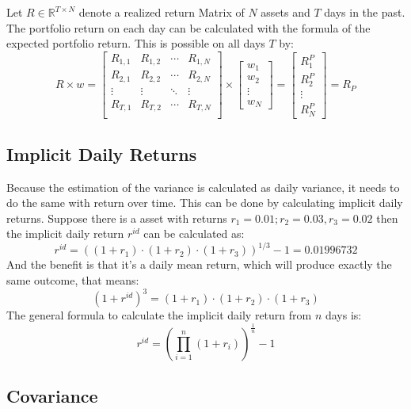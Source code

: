 \documentclass[
  oneside]{book}
\begin{document}
Let \(R \in \mathbb{R}^{T \times N}\) denote a realized return Matrix of \(N\) assets and \(T\) days in the past. The portfolio return on each day can be calculated with the formula of the expected portfolio return. This is possible on all days \(T\) by:
\[
  R \times w = 
  \begin{bmatrix}
    R_{1, 1} & R_{1, 2} & \cdots & R_{1, N} \\
    R_{2, 1} & R_{2, 2} & \cdots & R_{2, N} \\
    \vdots  & \vdots & \ddots & \vdots \\
    R_{T, 1} & R_{T, 2} & \cdots & R_{T, N} \\
 \end{bmatrix}
  \times 
  \begin{bmatrix}
    w_{1} \\ 
    w_{2} \\
    \vdots \\
    w_{N}  
 \end{bmatrix}
 =
   \begin{bmatrix}
    R_{1}^P \\ 
    R_{2}^P \\
    \vdots \\
    R_{N}^P  
 \end{bmatrix}
 =
 R_P
\]

\hypertarget{implicitdailyreturns}{%
\subsection{Implicit Daily Returns}\label{implicitdailyreturns}}

Because the estimation of the variance is calculated as daily variance, it needs to do the same with return over time. This can be done by calculating implicit daily returns. Suppose there is a asset with returns \(r_1 = 0.01; r_2=0.03, r_3=0.02\) then the implicit daily return \(r^{id}\) can be calculated as:
\[
  r^{id} = ((1+r_1) \cdot (1+r_2) \cdot (1+r_3))^{1/3}-1 = 0.01996732
\]
And the benefit is that it's a daily mean return, which will produce exactly the same outcome, that means:
\[
  (1+r^{id})^3 = (1+r_1) \cdot (1+r_2) \cdot (1+r_3)
\]
The general formula to calculate the implicit daily return from \(n\) days is:
\[
  r^{id} = (\prod_{i=1}^n (1+r_i))^{\frac{1}{n}}-1
\]

\hypertarget{covariance}{%
\subsection{Covariance}\label{covariance}}
\end{document}
